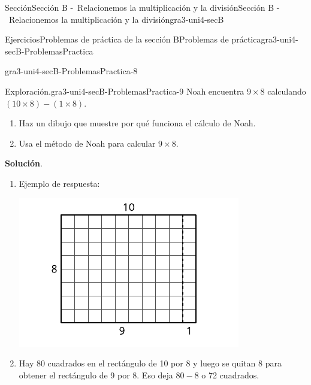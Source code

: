 \documentclass[oneside,10pt,]{article}
\newcommand{\blocktitlefont}{\relax}
\begin{document}
\begin{sectionptx}{Sección}{Sección B -~Relacionemos la multiplicación y la división}{}{Sección B -~Relacionemos la multiplicación y la división}{}{}{gra3-uni4-secB}
\begin{exercises-subsection}{Ejercicios}{Problemas de práctica de la sección B}{}{Problemas de práctica}{}{}{gra3-uni4-secB-ProblemasPractica}
\begin{divisionexercise}{6}{}{}{gra3-uni4-secB-ProblemasPractica-8}
\begin{sidebyside}{2}{0}{0}{0}
\begin{sbspanel}{0.4}
\end{sbspanel}%
\end{sidebyside}%
\end{divisionexercise}%
\begin{divisionexercise}{7}{Exploración.}{}{gra3-uni4-secB-ProblemasPractica-9}%
Noah encuentra \(9 \times 8\) calculando \((10 \times 8) - (1 \times 8)\).%
%
\begin{enumerate}[label={(\alph*)}]
\item{}Haz un dibujo que muestre por qué funciona el cálculo de Noah.%
\item{}Usa el método de Noah para calcular \(9\times 8\).%
\end{enumerate}
\par\smallskip%
\noindent\textbf{\blocktitlefont Solución}.\hypertarget{gra3-uni4-secB-ProblemasPractica-9-3}{}\quad{}%
\begin{enumerate}[label={(\alph*)}]
\item{}Ejemplo de respuesta:%
\begin{image}{0}{1}{0}{}%
\includegraphics[width=\linewidth]{external/svg-source/tikz-file-152440.pdf}
\end{image}%
\item{}Hay 80 cuadrados en el rectángulo de 10 por 8 y luego se quitan 8 para obtener el rectángulo de 9 por 8. Eso deja \(80 - 8\) o 72 cuadrados.%
\end{enumerate}
\end{divisionexercise}%
\end{exercises-subsection}
%
%
\typeout{************************************************}
\typeout{************************************************}

\end{sectionptx}
\end{document}
